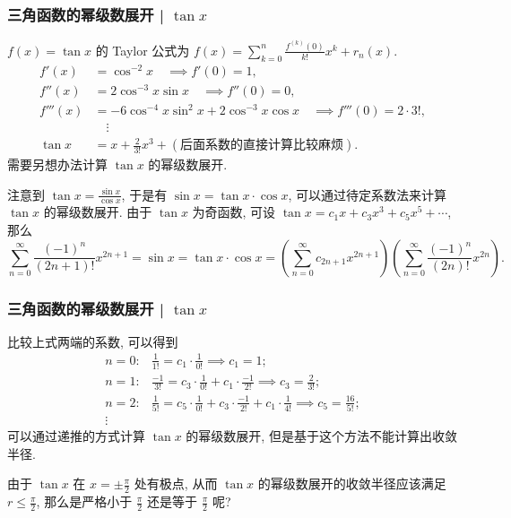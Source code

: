 
\begin{frame}
\frametitle{三角函数的幂级数展开 | $\tan x$}

$f(x) = \tan x$ 的 Taylor 公式为 $f(x) = \sum_{k=0}^n \frac{f^{(k)}(0)}{k!} x^k + r_n(x).$
\begin{align*}
f'(x) & = \cos^{-2} x \quad \implies f'(0) = 1, \\
f''(x) & = 2 \cos^{-3} x \sin x \quad \implies f''(0) = 0, \\
f'''(x) & = -6 \cos^{-4} x \sin^2 x + 2 \cos^{-3} x \cos x \quad \implies f'''(0) = 2 \cdot 3!, \\
& \hspace{1em} \vdots \\
\tan x & = x + \frac{2}{3!} x^3 + (\text{后面系数的直接计算比较麻烦}).
\end{align*}
需要另想办法计算 $\tan x$ 的幂级数展开.

\pause
\vspace{0.5em}

注意到 $\tan x = \frac{\sin x}{\cos x}$, 于是有 $\sin x = \tan x \cdot \cos x$, 可以通过待定系数法来计算 $\tan x$ 的幂级数展开. 由于 $\tan x$ 为奇函数, 可设 $\tan x = c_1 x + c_3 x^3 + c_5 x^5 + \cdots$, 那么
\[
\sum_{n=0}^\infty \frac{(-1)^n}{(2n+1)!} x^{2n+1} = \sin x = \tan x \cdot \cos x = \left( \sum_{n=0}^\infty c_{2n+1} x^{2n+1} \right) \left( \sum_{n=0}^\infty \frac{(-1)^n}{(2n)!} x^{2n} \right).
\]

\end{frame}


\begin{frame}
\frametitle{三角函数的幂级数展开 | $\tan x$}

比较上式两端的系数, 可以得到
\begin{align*}
n = 0: & \frac{1}{1!} = c_1 \cdot \frac{1}{0!} \implies c_1 = 1; \\
n = 1: & \frac{-1}{3!} = c_3 \cdot \frac{1}{0!} + c_1 \cdot \frac{-1}{2!} \implies c_3 = \frac{2}{3!}; \\
n = 2: & \frac{1}{5!} = c_5 \cdot \frac{1}{0!} + c_3 \cdot \frac{-1}{2!} + c_1 \cdot \frac{1}{4!} \implies c_5 = \frac{16}{5!}; \\
\vdots
\end{align*}
可以通过递推的方式计算 $\tan x$ 的幂级数展开, 但是基于这个方法不能计算出收敛半径.

\pause
\vspace{0.5em}

由于 $\tan x$ 在 $x = \pm \frac{\pi}{2}$ 处有极点, 从而 $\tan x$ 的幂级数展开的收敛半径应该满足 $r \leqslant \frac{\pi}{2}$, 那么是严格小于 $\frac{\pi}{2}$ 还是等于 $\frac{\pi}{2}$ 呢?

\end{frame}

